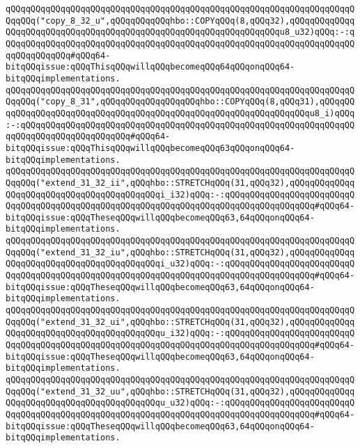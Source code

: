 \verb|qQQqqQQqqQQqqQQqqQQqqQQqqQQqqQQqqQQqqQQqqQQqqQQqqQQqqQQqqQQqqQQqqQQqqQQqqQQq("copy_8_32_u",qQQqqQQqqQQqhbo::COPYqQQq(8,qQQq32),qQQqqQQqqQQqqQQqqQQqqQQqqQQqqQQqqQQqqQQqqQQqqQQqqQQqqQQqqQQqqQQqqQQqu8_u32)qQQq:-:qQQqqQQqqQQqqQQqqQQqqQQqqQQqqQQqqQQqqQQqqQQqqQQqqQQqqQQqqQQqqQQqqQQqqQQqqQQqqQQqqQQq#qQQq64-bitqQQqissue:qQQqThisqQQqwillqQQqbecomeqQQq64qQQqonqQQq64-bitqQQqimplementations.|\newline
\newline
\verb|qQQqqQQqqQQqqQQqqQQqqQQqqQQqqQQqqQQqqQQqqQQqqQQqqQQqqQQqqQQqqQQqqQQqqQQqqQQq("copy_8_31",qQQqqQQqqQQqqQQqqQQqhbo::COPYqQQq(8,qQQq31),qQQqqQQqqQQqqQQqqQQqqQQqqQQqqQQqqQQqqQQqqQQqqQQqqQQqqQQqqQQqqQQqqQQqu8_i)qQQq:-:qQQqqQQqqQQqqQQqqQQqqQQqqQQqqQQqqQQqqQQqqQQqqQQqqQQqqQQqqQQqqQQqqQQqqQQqqQQqqQQqqQQqqQQqqQQq#qQQq64-bitqQQqissue:qQQqThisqQQqwillqQQqbecomeqQQq63qQQqonqQQq64-bitqQQqimplementations.|\newline
\newline
\verb|qQQqqQQqqQQqqQQqqQQqqQQqqQQqqQQqqQQqqQQqqQQqqQQqqQQqqQQqqQQqqQQqqQQqqQQqqQQq("extend_31_32_ii",qQQqhbo::STRETCHqQQq(31,qQQq32),qQQqqQQqqQQqqQQqqQQqqQQqqQQqqQQqqQQqqQQqqQQqi_i32)qQQq:-:qQQqqQQqqQQqqQQqqQQqqQQqqQQqqQQqqQQqqQQqqQQqqQQqqQQqqQQqqQQqqQQqqQQqqQQqqQQqqQQqqQQqqQQq#qQQq64-bitqQQqissue:qQQqTheseqQQqwillqQQqbecomeqQQq63,64qQQqonqQQq64-bitqQQqimplementations.|\newline
\verb|qQQqqQQqqQQqqQQqqQQqqQQqqQQqqQQqqQQqqQQqqQQqqQQqqQQqqQQqqQQqqQQqqQQqqQQqqQQq("extend_31_32_iu",qQQqhbo::STRETCHqQQq(31,qQQq32),qQQqqQQqqQQqqQQqqQQqqQQqqQQqqQQqqQQqqQQqqQQqi_u32)qQQq:-:qQQqqQQqqQQqqQQqqQQqqQQqqQQqqQQqqQQqqQQqqQQqqQQqqQQqqQQqqQQqqQQqqQQqqQQqqQQqqQQqqQQqqQQq#qQQq64-bitqQQqissue:qQQqTheseqQQqwillqQQqbecomeqQQq63,64qQQqonqQQq64-bitqQQqimplementations.|\newline
\verb|qQQqqQQqqQQqqQQqqQQqqQQqqQQqqQQqqQQqqQQqqQQqqQQqqQQqqQQqqQQqqQQqqQQqqQQqqQQq("extend_31_32_ui",qQQqhbo::STRETCHqQQq(31,qQQq32),qQQqqQQqqQQqqQQqqQQqqQQqqQQqqQQqqQQqqQQqqQQqu_i32)qQQq:-:qQQqqQQqqQQqqQQqqQQqqQQqqQQqqQQqqQQqqQQqqQQqqQQqqQQqqQQqqQQqqQQqqQQqqQQqqQQqqQQqqQQqqQQq#qQQq64-bitqQQqissue:qQQqTheseqQQqwillqQQqbecomeqQQq63,64qQQqonqQQq64-bitqQQqimplementations.|\newline
\verb|qQQqqQQqqQQqqQQqqQQqqQQqqQQqqQQqqQQqqQQqqQQqqQQqqQQqqQQqqQQqqQQqqQQqqQQqqQQq("extend_31_32_uu",qQQqhbo::STRETCHqQQq(31,qQQq32),qQQqqQQqqQQqqQQqqQQqqQQqqQQqqQQqqQQqqQQqqQQqu_u32)qQQq:-:qQQqqQQqqQQqqQQqqQQqqQQqqQQqqQQqqQQqqQQqqQQqqQQqqQQqqQQqqQQqqQQqqQQqqQQqqQQqqQQqqQQqqQQq#qQQq64-bitqQQqissue:qQQqTheseqQQqwillqQQqbecomeqQQq63,64qQQqonqQQq64-bitqQQqimplementations.|\newline
